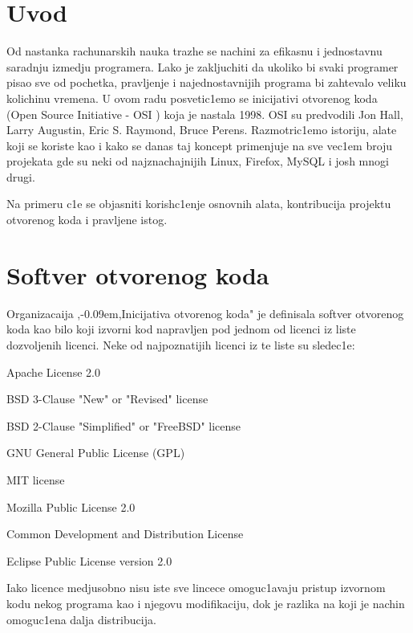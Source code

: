 \documentclass[a4paper,fleqn,12pt]{JMThesis}
\newcommand{\latin}{\fontencoding{T1}\selectfont}
\theoremstyle{plain}
\theoremstyle{definition}
\def\zn{,\kern-0.09em,}
\begin{document}
\chapter[Uvod]{Uvod}
Od nastanka rachunarskih nauka trazhe se nachini za efikasnu i jednostavnu saradnju izmedju programera. 
Lako je zakljuchiti da ukoliko bi svaki programer pisao sve od pochetka, pravljenje i najednostavnijih programa bi zahtevalo veliku kolichinu vremena. 
U ovom radu posvetic1emo se inicijativi otvorenog koda ({\latin Open Source Initiative - OSI }) koja je nastala 1998. 
{\latin OSI} su predvodili  {\latin Jon Hall, Larry Augustin, Eric S. Raymond, Bruce Perens}. 
Razmotric1emo istoriju, alate koji se koriste kao i kako se danas taj koncept primenjuje na sve vec1em broju projekata gde su neki od najznachajnijih {\latin Linux, Firefox, MySQL} i josh mnogi drugi. \par
Na primeru c1e se objasniti korish\-c1enje osnovnih alata, kontribucija projektu otvorenog koda i pravljene istog.




\chapter[Softver otvorenog koda]{Softver otvorenog koda}
\bigskip

Organizacaija \zn Inicijativa otvorenog koda" je definisala softver otvorenog koda kao bilo koji izvorni kod napravljen pod jednom od licenci iz liste dozvoljenih licenci. 
Neke od najpoznatijih licenci iz te liste su sledec1e:
\begin{itemize}
{\latin
    \item Apache License 2.0
    \item BSD 3-Clause "New" or "Revised" license
    \item BSD 2-Clause "\-Simplified" or "FreeBSD"  license
    \item GNU General Public License (GPL)
    \item MIT license
    \item Mozilla Public License 2.0
    \item Common Development and Distribution License
    \item Eclipse Public License version 2.0
    }
\end{itemize}
Iako licence medjusobno nisu iste sve lincece omoguc1avaju pristup izvornom kodu nekog programa kao i njegovu modifikaciju, dok je razlika na koji je nachin omoguc1ena dalja distribucija. 
\end{document}
